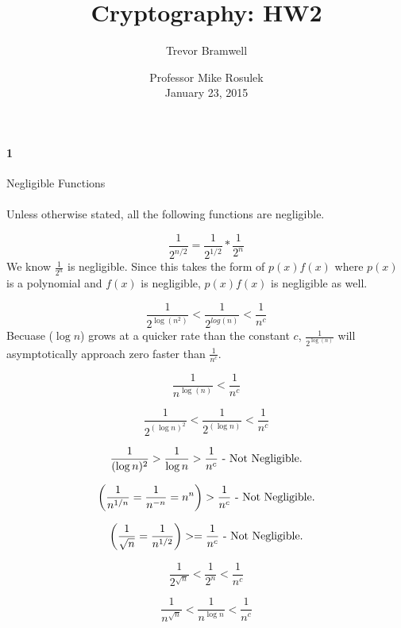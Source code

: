 \documentclass[12pt]{article}
\title{Cryptography: HW2}
\author{Trevor Bramwell}
\date{
    Professor Mike Rosulek\\
    January 23, 2015
}
\begin{document}
\maketitle


\paragraph{1} Negligible Functions
\\\\
Unless otherwise stated, all the following functions are negligible.

    \[
        \frac{1}{2^{n/2}} =  \frac{1}{2^{1/2}} * \frac{1}{2^{n}}
    \]
    We know $\frac{1}{2^{n}}$ is negligible. Since this takes the form
    of $p(x)f(x)$ where $p(x)$ is a polynomial and $f(x)$ is negligible,
    $p(x)f(x)$ is negligible as well.

    \[
        \frac{1}{2^{\log{(n^2)}}} < \frac{1}{2^{log(n)}} < \frac{1}{n^c}
    \]
    Becuase ($\log{n}$) grows at a quicker rate than the constant $c$,
    $\frac{1}{2^{\log{(n)}}}$ will asymptotically approach zero faster
    than $\frac{1}{n^c}$.

    \[
        \frac{1}{n^{\log{(n)}}} < \frac{1}{n^c}
    \]

    \[
        \frac{1}{2^{(\log{n})^2}} < \frac{1}{2^{(\log{n})}} < \frac{1}{n^c}
    \]


    \[
        \frac{1}{(\log{n})^2} > \frac{1}{\log{n}} > \frac{1}{n^c}
        \\
        \text{ - Not Negligible.}
    \]

    \[
        \left(\frac{1}{n^{1/n}} = \frac{1}{n^{-n}} = n^{n}\right) >
        \frac{1}{n^c}
        \\
        \text{ - Not Negligible.}
    \]

    \[
        \left(\frac{1}{\sqrt{n}} = \frac{1}{n^{1/2}}\right) >= \frac{1}{n^c}
        \\
        \text{ - Not Negligible.}
    \]

    \[
        \frac{1}{2^{\sqrt{n}}} < \frac{1}{2^n} < \frac{1}{n^c}
    \]

    \[
        \frac{1}{n^{\sqrt{n}}} < \frac{1}{n^{\log{n}}} < \frac{1}{n^c}
    \]
\end{document}
